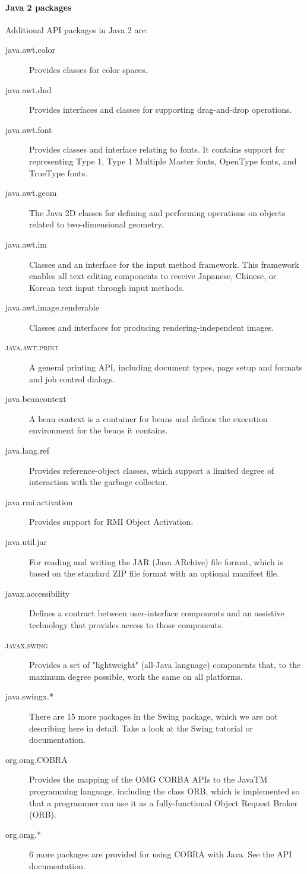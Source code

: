 \paragraph{Java 2 packages}
Additional API packages in Java 2 are:
\begin{description}
\item[java.awt.color] Provides classes for color spaces.
\item[java.awt.dnd] Provides interfaces and classes for supporting drag-and-drop operations.
\item[java.awt.font] Provides classes and interface relating to fonts. It contains support for representing Type 1, Type 1 Multiple Master fonts,
OpenType fonts, and TrueType fonts. 
\item[java.awt.geom] The Java 2D classes for defining and performing operations on objects related to two-dimensional geometry. 
\item[java.awt.im] Classes and an interface for the input method framework. This framework enables all text editing components to receive Japanese, Chinese, or Korean text input through input methods. 
\item[java.awt.image.renderable] Classes and interfaces for producing rendering-independent images.
\item[\textsc{java.awt.print}] A general printing API, including document types, 
  page setup and formats and job control dialogs.
\item[java.beancontext] A bean context is a container for beans and defines the execution environment for the beans it contains.
\item[java.lang.ref] Provides reference-object classes, which support a limited degree of interaction with the garbage collector.
\item[java.rmi.activation] Provides support for RMI Object Activation.
\item[java.util.jar] For reading and writing the JAR (Java ARchive) file format, which is based on the standard ZIP file format with an optional manifest file. 
\item[javax.accessibility] Defines a contract between user-interface components and an assistive technology that provides access to those components. 
\item[\textsc{javax.swing}] Provides a set of "lightweight" (all-Java language) components that, to the maximum degree possible, work the same on all
platforms. 
\item[java.swingx.*] There are 15 more packages in the Swing package, which we are not describing here in detail. Take a look at the Swing tutorial or documentation.
\item[org.omg.COBRA] Provides the mapping of the OMG CORBA APIs to the JavaTM programming language, including the class ORB, which is implemented so that a programmer can use it as a fully-functional Object Request Broker (ORB).
\item[org.omg.*] 6 more packages are provided for using COBRA with Java. See the API documentation.
\end{description}

